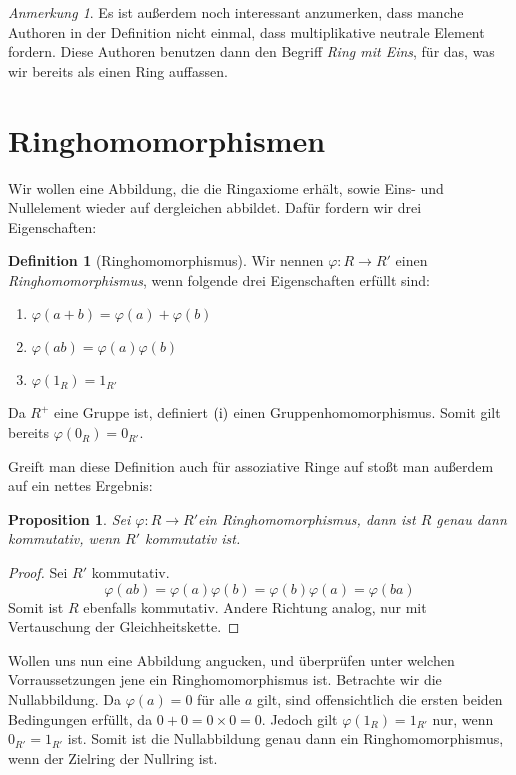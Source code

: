 \documentclass{article}
\newtheorem*{prop}{Proposition}
\theoremstyle{definition}
\newtheorem*{definition}{Definition}
\theoremstyle{remark}
\newtheorem*{anm}{Anmerkung}
\begin{document}
\begin{anm} Es ist außerdem noch interessant anzumerken, dass manche Authoren in der Definition nicht einmal,
    dass multiplikative neutrale Element fordern. Diese Authoren benutzen dann den Begriff \emph{Ring mit Eins},
    für das, was wir bereits als einen Ring auffassen.

\end{anm}

\newpage
\section{Ringhomomorphismen}

Wir wollen eine Abbildung, die die Ringaxiome erhält, sowie Eins- und Nullelement wieder auf dergleichen
abbildet. Dafür fordern wir drei Eigenschaften:

\begin{definition}[Ringhomomorphismus] Wir nennen $\varphi: R\to R'$ einen \emph{Ringhomomorphismus}, wenn
    folgende drei Eigenschaften erfüllt sind: \begin{enumerate}[label=(\roman*)]
    \item $\varphi(a+b) = \varphi(a) + \varphi(b)$
    \item $\varphi(a b) = \varphi(a)   \varphi(b)$
    \item $\varphi(1_R) = 1_{R'}$
\end{enumerate}
\end{definition}

Da $R^+$ eine Gruppe ist, definiert $(\text i)$ einen Gruppenhomomorphismus. Somit gilt bereits
$\varphi(0_R)=0_{R'}$. \vspace{1em}

Greift man diese Definition auch für assoziative Ringe auf stoßt man außerdem auf ein nettes Ergebnis:

\begin{prop} Sei $\varphi: R\to R'$ein Ringhomomorphismus, dann ist $R$ genau dann kommutativ, wenn $R'$
kommutativ ist. \end{prop}

\begin{proof} Sei $R'$ kommutativ.
\[\varphi(ab) = \varphi(a)\varphi(b) = \varphi(b)\varphi(a) = \varphi(ba)\]
Somit ist $R$ ebenfalls kommutativ. Andere Richtung analog, nur mit Vertauschung der Gleichheitskette.
\end{proof}

Wollen uns nun eine Abbildung angucken, und überprüfen unter welchen Vorraussetzungen jene ein
Ringhomomorphismus ist. Betrachte wir die Nullabbildung. Da $\varphi(a)=0$ für alle $a$ gilt, sind
offensichtlich die ersten beiden Bedingungen erfüllt, da $0+0=0\times0=0$. Jedoch gilt $\varphi(1_R)=1_{R'}$
nur, wenn $0_{R'}=1_{R'}$ ist. Somit ist die Nullabbildung genau dann ein Ringhomomorphismus, wenn der
Zielring der Nullring ist.
\end{document}
